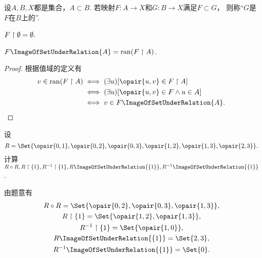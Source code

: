 \begin{definition}
设\(A,B,X\)都是集合，\(A \subset B\).
若映射\(F\colon A \to X\)和\(G\colon B \to X\)满足\(F \subset G\)，
则称“\(G\)是\(F\)在\(B\)上的”.
\end{definition}

\begin{theorem}
\(F \upharpoonright \emptyset = \emptyset\).
\end{theorem}

\begin{theorem}
\(F\ImageOfSetUnderRelation{A} = \ran(F \setrestrict A)\).
\begin{proof}
根据值域的定义有\begin{align*}
	v \in \ran(F \setrestrict A)
	&\iff
	(\exists u)[\opair{u,v} \in F \setrestrict A] \\
	&\iff
	(\exists u)[\opair{u,v} \in F \land u \in A] \\
	&\iff
	v \in F\ImageOfSetUnderRelation{A}.
	\qedhere
\end{align*}
\end{proof}
\end{theorem}

\begin{example}
设\[
	R = \Set{
		\opair{0,1},
		\opair{0,2},
		\opair{0,3},
		\opair{1,2},
		\opair{1,3},
		\opair{2,3}
	}.
\]
计算\(R \circ R,
R \setrestrict \{1\},
R^{-1} \setrestrict \{1\},
R\ImageOfSetUnderRelation{\{1\}},
R^{-1}\ImageOfSetUnderRelation{\{1\}}\).
\begin{solution}
由题意有\begin{gather*}
	R \circ R
	= \Set{
		\opair{0,2},
		\opair{0,3},
		\opair{1,3}
	}, \\
	R \setrestrict \{1\}
	= \Set{
		\opair{1,2},
		\opair{1,3}
	}, \\
	R^{-1} \setrestrict \{1\}
	= \Set{
		\opair{1,0}
	}, \\
	R\ImageOfSetUnderRelation{\{1\}}
	= \Set{
		2,
		3
	}, \\
	R^{-1}\ImageOfSetUnderRelation{\{1\}}
	= \Set{
		0
	}.
\end{gather*}
\end{solution}
\end{example}

